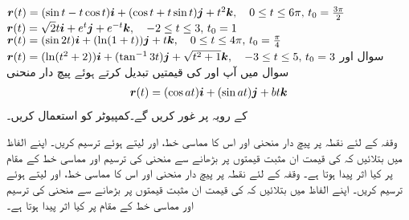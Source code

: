 ${{\boldsymbol{r}}}(t)=(\sin t-t\cos t){\boldsymbol{i}}+(\cos t+t\sin t){\boldsymbol{j}}+t^2{\boldsymbol{k}},\quad 0\le t\le 6\pi,\, t_0=\frac{3\pi}{2}$
${{\boldsymbol{r}}}(t)=\sqrt{2}t{\boldsymbol{i}}+e^t{\boldsymbol{j}}+e^{-t}{\boldsymbol{k}},\quad -2\le t\le 3,\, t_0=1$
${{\boldsymbol{r}}}(t)=(\sin 2t){\boldsymbol{i}}+(\ln(1+t)){\boldsymbol{j}}+t{\boldsymbol{k}},\quad 0\le t\le 4\pi,\, t_0=\frac{\pi}{4}$
${{\boldsymbol{r}}}(t)=(\ln(t^2+2)){\boldsymbol{i}}+(\tan^{-1}3t){\boldsymbol{j}}+\sqrt{t^2+1}{\boldsymbol{k}},\quad -3\le t\le 5,\, t_0=3$
سوال  اور سوال    میں  آپ   اور  کی قیمتیں تبدیل کرتے ہوئے پیچ دار منحنی
\begin{align*}
{\ensuremath{{\boldsymbol{r}}}}(t)=(\cos at){\boldsymbol{i}}+(\sin at){\boldsymbol{j}}+bt {\boldsymbol{k}}
\end{align*}
کے رویہ پر غور کریں گے۔کمپیوٹر کو استعمال کریں۔

وقفہ  کے لئے نقطہ   پر پیچ دار منحنی اور اس کا مماسی خط،   اور  لیتے ہوئے    ترسیم کریں۔ اپنے الفاظ میں بتلائیں کہ  کی قیمت ان مثبت  قیمتوں پر بڑھانے سے منحنی   کی ترسیم اور مماسی خط کے مقام  پر کیا اثر پیدا ہوتا ہے۔ 
وقفہ  کے لئے نقطہ   پر پیچ دار منحنی اور اس کا مماسی خط،   اور  لیتے ہوئے    ترسیم کریں۔ اپنے الفاظ میں بتلائیں کہ  کی قیمت ان مثبت  قیمتوں   پر بڑھانے سے منحنی   کی ترسیم اور مماسی خط کے مقام  پر کیا اثر پیدا ہوتا ہے۔ 

